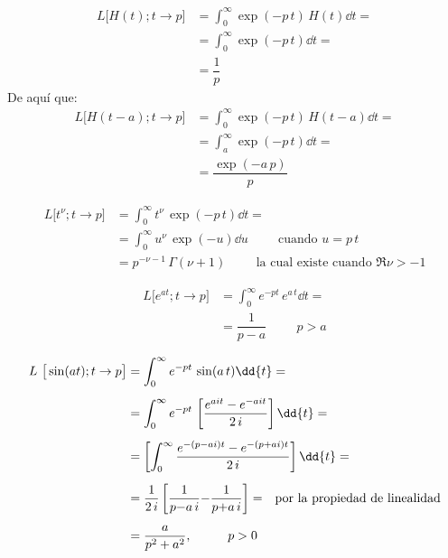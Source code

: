 \begin{ejemplo}
\begin{align*}
L \big[H(t); t \to p\big] &= \int_{0}^{\infty} \exp(- p \, t) \, H(t) \dd{t} = \\[0.5em]
&= \int_{0}^{\infty} \exp(- p \, t) \dd{t} = \\[0.5em]
&= \dfrac{1}{p}
\end{align*}
De aquí que:
\begin{align*}
L \big[H(t - a); t \to p\big] &= \int_{0}^{\infty} \exp(- p \, t) \, H(t - a) \dd{t} = \\[0.5em]
&= \int_{a}^{\infty} \exp(- p \, t) \dd{t} = \\[0.5em]
&= \dfrac{\exp(-a \, p)}{p}
\end{align*}
\end{ejemplo}
\begin{ejemplo}
\begin{align*}
L \big[t^{\nu}; t \to p\big] &= \int_{0}^{\infty} t^{\nu} \, \exp(- p \, t) \dd{t} = \\[0.5em]
&= \int_{0}^{\infty} u^{\nu} \, \exp(-u) \dd{u} \hspace{1cm} \mbox{cuando  } u = p \, t \\[0.5em]
&= p^{-\nu - 1} \, \Gamma (\nu + 1) \hspace{1cm} \mbox{la cual existe cuando  } \Re{\nu} > - 1
\end{align*}
\end{ejemplo}
\begin{ejemplo}
\begin{align*}
L \big[e^{a t}; t \to p\big] &= \int_{0}^{\infty} e^{-p t} \, e^{a \, t} \dd{t} = \\[0.5em]
&= \dfrac{1}{p - a} \hspace{1cm} p > a
\end{align*}
\end{ejemplo}
\begin{ejemplo}
\begin{align*}
L \big[\sin (a t); t \to p\big] &= \int_{0}^{\infty} e^{-p t} \, \sin (a \, t) \dd{t} = \\[0.5em]
&= \int_{0}^{\infty} e^{-p t} \,\left[ \dfrac{e^{a i t} - e^{- a i t}}{2 \, i} \right] \dd{t} = \\[0.5em]
&= \left[ \int_{0}^{\infty}  \dfrac{e^{-(p - a i) t} - e^{- (p + a i) t}}{2 \, i} \right] \dd{t} = \\[0.5em]
&= \dfrac{1}{2 \, i} \left[ \dfrac{1}{p {-} a \, i} {-} \dfrac{1}{p {+} a \, i} \right] = \hspace{0.25cm} \mbox{por la propiedad de linealidad} \\[0.5em]
&= \dfrac{a}{p^{2} + a^{2}}, \hspace{1cm} p > 0
\end{align*}
\end{ejemplo}
